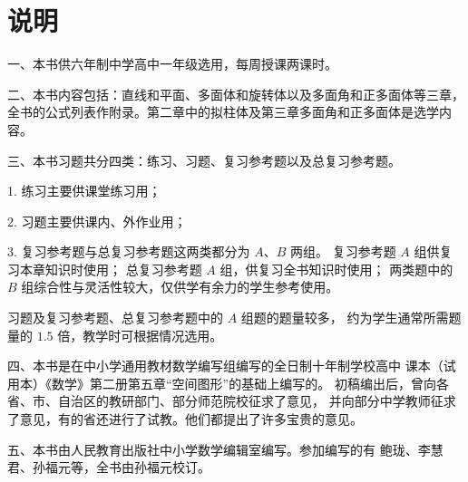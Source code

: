 
\chapter{说明}

一、本书供六年制中学高中一年级选用，每周授课两课时。

二、本书内容包括：直线和平面、多面体和旋转体以及多面角和正多面体等三章，
全书的公式列表作附录。第二章中的拟柱体及第三章多面角和正多面体是选学内容。

三、本书习题共分四类：练习、习题、复习参考题以及总复习参考题。

1. 练习\quad 主要供课堂练习用；

2. 习题\quad 主要供课内、外作业用；

3. 复习参考题与总复习参考题\quad 这两类都分为 $A$、$B$ 两组。
复习参考题 $A$ 组供复习本章知识时使用；
总复习参考题 $A$ 组，供复习全书知识时使用；
两类题中的 $B$ 组综合性与灵活性较大，仅供学有余力的学生参考使用。

习题及复习参考题、总复习参考题中的 $A$ 组题的题量较多，
约为学生通常所需题量的 $1.5$ 倍，教学时可根据情况选用。

四、本书是在中小学通用教材数学编写组编写的全日制十年制学校高中
课本（试用本）《数学》第二册第五章“空间图形”的基础上编写的。
初稿编出后，曾向各省、市、自治区的教研部门、部分师范院校征求了意见，
并向部分中学教师征求了意见，有的省还进行了试教。他们都提出了许多宝贵的意见。

五、本书由人民教育出版社中小学数学编辑室编写。参加编写的有
鲍珑、李慧君、孙福元等，全书由孙福元校订。

